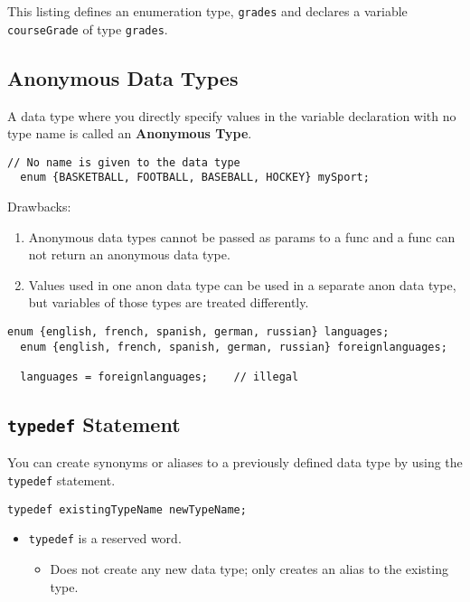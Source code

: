\documentclass{article}
\begin{document}
This listing defines an enumeration type, \texttt{grades} and declares a
variable \texttt{courseGrade} of type \texttt{grades}.

\subsection{Anonymous Data Types}
A data type where you directly specify values in the variable declaration with
no type name is called an \textbf{Anonymous Type}.
\begin{lstlisting}[caption={Anonymous Enumeration Type Example}]
  // No name is given to the data type
  enum {BASKETBALL, FOOTBALL, BASEBALL, HOCKEY} mySport;
\end{lstlisting}

Drawbacks:
\begin{enumerate}
  \item Anonymous data types cannot be passed as params to a func and a func can
    not return an anonymous data type.
  \item Values used in one anon data type can be used in a separate anon data
    type, but variables of those types are treated differently.
\end{enumerate}

\begin{lstlisting}[caption={illegal \texttt{enum} operations}]
  enum {english, french, spanish, german, russian} languages;
  enum {english, french, spanish, german, russian} foreignlanguages;

  languages = foreignlanguages;    // illegal
\end{lstlisting}

\subsection{\texttt{typedef} Statement}
You can create synonyms or aliases to a previously defined data type by using
the \texttt{typedef} statement.

\begin{lstlisting}[caption={\texttt{typedef} Statement Syntax}]
  typedef existingTypeName newTypeName;
\end{lstlisting}

\begin{itemize}
  \item \texttt{typedef} is a reserved word.
    \begin{itemize}
      \item Does not create any new data type; only creates an alias to the
        existing type.
    \end{itemize}
\end{itemize}
\end{document}
